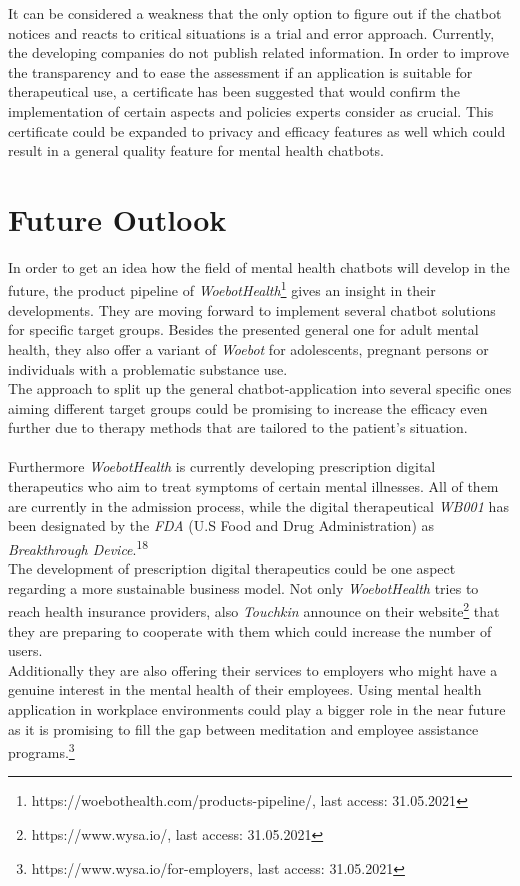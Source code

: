 \documentclass[sigconf, nonacm]{acmart}
\begin{document}
It can be considered a weakness that the only option to figure out if the chatbot notices and reacts to critical situations is a trial and error approach. Currently, the developing companies do not publish related information. In order to improve the transparency and to ease the assessment if an application is suitable for therapeutical use, a certificate has been suggested that would confirm the implementation of certain aspects and policies experts consider as crucial.
This certificate could be expanded to privacy and efficacy features as well which could result in a general quality feature for mental health chatbots.

\section{Future Outlook}
In order to get an idea how the field of mental health chatbots will develop in the future, the product pipeline of \emph{WoebotHealth}\footnote{https://woebothealth.com/products-pipeline/, last access: 31.05.2021} gives an insight in their developments. They are moving forward to implement several chatbot solutions for specific target groups. Besides the presented general one for adult mental health, they also offer a variant of \emph{Woebot} for adolescents, pregnant persons or 
individuals with a problematic substance use.
\\
The approach to split up the general chatbot-application into several specific ones aiming different target groups could be promising to increase the efficacy even further due to therapy methods that are tailored to the patient's situation. 
\\\\
Furthermore \emph{WoebotHealth} is currently developing prescription digital therapeutics who aim to treat symptoms of certain mental illnesses. All of them are currently in the admission process, while the digital therapeutical \emph{WB001} has been designated by the \emph{FDA} (U.S Food and Drug Administration) as \emph{Breakthrough Device}.\textsuperscript{18}
\\
The development of prescription digital therapeutics could be one aspect regarding a more sustainable business model. Not only \emph{WoebotHealth} tries to reach health insurance providers, also \emph{Touchkin} announce on their website\footnote{https://www.wysa.io/, last access: 31.05.2021} that they are preparing to cooperate with them which could increase the number of users.
\\
Additionally they are also offering their services to employers who might have a genuine interest in the mental health of their employees. Using mental health application in workplace environments could play a bigger role in the near future as it is promising to fill the gap between meditation and employee assistance programs.\footnote{https://www.wysa.io/for-employers, last access: 31.05.2021}
\end{document}
